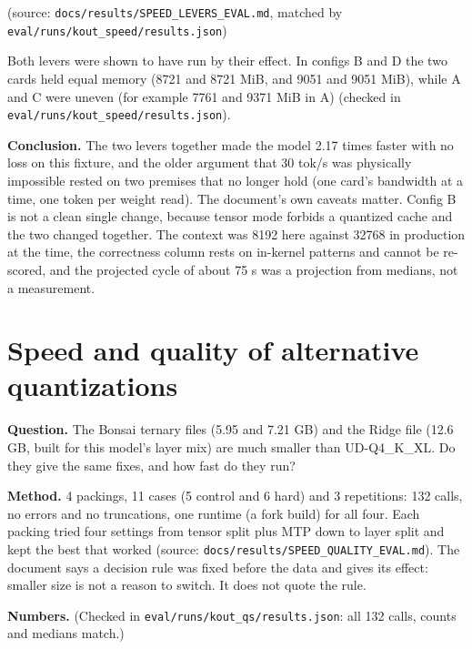 \documentclass[11pt,a4paper]{report}
\begin{document}
(source: \texttt{docs/\allowbreak{}results/\allowbreak{}SPEED\_\allowbreak{}LEVERS\_\allowbreak{}EVAL.\allowbreak{}md}, matched by \texttt{eval/\allowbreak{}runs/\allowbreak{}kout\_\allowbreak{}speed/\allowbreak{}results.\allowbreak{}json})

Both levers were shown to have run by their effect. In configs B and D the two cards held equal memory (8721 and 8721 MiB, and 9051 and 9051 MiB), while A and C were uneven (for example 7761 and 9371 MiB in A) (checked in \texttt{eval/\allowbreak{}runs/\allowbreak{}kout\_\allowbreak{}speed/\allowbreak{}results.\allowbreak{}json}).

\textbf{Conclusion.} The two levers together made the model 2.17 times faster with no loss on this fixture, and the older argument that 30 tok/s was physically impossible rested on two premises that no longer hold (one card's bandwidth at a time, one token per weight read). The document's own caveats matter. Config B is not a clean single change, because tensor mode forbids a quantized cache and the two changed together. The context was 8192 here against 32768 in production at the time, the correctness column rests on in-kernel patterns and cannot be re-scored, and the projected cycle of about 75 s was a projection from medians, not a measurement.

\section{Speed and quality of alternative quantizations}

\textbf{Question.} The Bonsai ternary files (5.95 and 7.21 GB) and the Ridge file (12.6 GB, built for this model's layer mix) are much smaller than UD-Q4\_K\_XL. Do they give the same fixes, and how fast do they run?

\textbf{Method.} 4 packings, 11 cases (5 control and 6 hard) and 3 repetitions: 132 calls, no errors and no truncations, one runtime (a fork build) for all four. Each packing tried four settings from tensor split plus MTP down to layer split and kept the best that worked (source: \texttt{docs/\allowbreak{}results/\allowbreak{}SPEED\_\allowbreak{}QUALITY\_\allowbreak{}EVAL.\allowbreak{}md}). The document says a decision rule was fixed before the data and gives its effect: smaller size is not a reason to switch. It does not quote the rule.

\textbf{Numbers.} (Checked in \texttt{eval/\allowbreak{}runs/\allowbreak{}kout\_\allowbreak{}qs/\allowbreak{}results.\allowbreak{}json}: all 132 calls, counts and medians match.)
\end{document}
